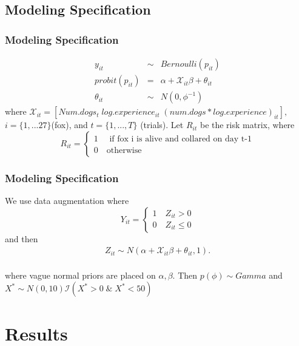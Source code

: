\documentclass{beamer}
\begin{document}
\subsection{Modeling Specification}
\begin{frame}
	\frametitle{Modeling Specification}
\begin{eqnarray}
y_{it} &\sim& Bernoulli(p_{it}) \\
probit(p_{it}) & = & \alpha + \mathcal{X}_{it}\beta+ \theta_{it} \\
\theta_{it} &\sim& N(0, \phi^{-1})
\end{eqnarray}
where $\mathcal{X}_{it} = [Num.dogs_t\; log.experience_{it}\; (num.dogs*log.experience)_{it}],$ $i = \{1,...27\} $(fox), and $t= \{1,...,T\}$ (trials). Let $R_{it}$ be the risk matrix, where
\[
    R_{it}=\left\{
                \begin{array}{ll}
                  1 \quad \text{ if fox i is alive and collared on day t-1}\\
                  0 \quad \text{otherwise}
                \end{array}
              \right.
  \]
 \end{frame}
\begin{frame}
	\frametitle{Modeling Specification}
	 We use data augmentation where 
	 \[
    Y_{it}=\left\{
                \begin{array}{ll}
                  1 \quad  Z_{it} > 0\\
                  0 \quad Z_{it} \leq 0
                \end{array}
              \right.
  \]
and then
  \begin{eqnarray}
  Z_{it} \sim N( \alpha + \mathcal{X}_{it}\beta +\theta_{it},1).
  \end{eqnarray}
\\
where vague normal priors are placed on $\alpha, \beta$. Then $p(\phi) \sim Gamma$ and $X^{*} \sim N(0,10) \mathcal{I}(X^* > 0 \;\&\; X^* < 50)$ 
\end{frame}
\section{Results}
\end{document}
